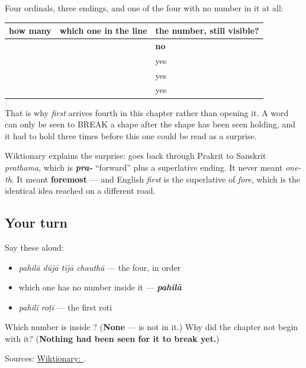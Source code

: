 \begin{grammarlens}[title={What you've built}]
Four ordinals, three endings, and one of the four with no number in it at all:

\noindent
\begin{tabularx}{\linewidth}{@{}>{\raggedright\arraybackslash}X>{\raggedright\arraybackslash}X>{\raggedright\arraybackslash}X@{}}
\toprule
\textbf{how many} & \textbf{which one in the line} & \textbf{the number, still visible?} \\
\midrule
\textbf{\pa{ਇੱਕ}} & \textbf{\pa{ਪਹਿਲਾ}} & \textbf{no} \\
\textbf{\pa{ਦੋ}} & \textbf{\pa{ਦੂਜਾ}} & yes \\
\textbf{\pa{ਤਿੰਨ}} & \textbf{\pa{ਤੀਜਾ}} & yes \\
\textbf{\pa{ਚਾਰ}} & \textbf{\pa{ਚੌਥਾ}} & yes \\
\bottomrule
\end{tabularx}

That is why \emph{first} arrives fourth in this chapter rather than opening it. A word can only be seen to BREAK a shape after the shape has been seen holding, and it had to hold three times before this one could be read as a surprise.

Wiktionary explains the surprise: \textbf{} goes back through Prakrit to Sanskrit \emph{prathama}, which is \emph{\textbf{pra-}} \textquotedblleft{}forward\textquotedblright{} plus a superlative ending. It never meant \emph{one-th}. It meant \textbf{foremost} — and English \emph{first} is the superlative of \emph{fore}, which is the identical idea reached on a different road.
\end{grammarlens}

\subsection*{Your turn}
Say these aloud:

\begin{itemize}
\raggedright
  \item \emph{pahilā dūjā tījā chauthā} — the four, in order
  \item which one has no number inside it — \emph{\textbf{pahilā}}
  \item \emph{pahilī roṭī} — the first roti
\end{itemize}

\begin{tcolorbox}[breakable,colback=teal!4,colframe=teal!35!black,title={Before you move on}]
Which number is inside \textbf{}? (\textbf{None} — \textbf{} is not in it.) Why did the chapter not begin with it? (\textbf{Nothing had been seen for it to break yet.})

Sources: \href{https://en.wiktionary.org/wiki/\%E0\%A8\%AA\%E0\%A8\%B9\%E0\%A8\%BF\%E0\%A8\%B2\%E0\%A8\%BE}{Wiktionary: }.
\end{tcolorbox}
